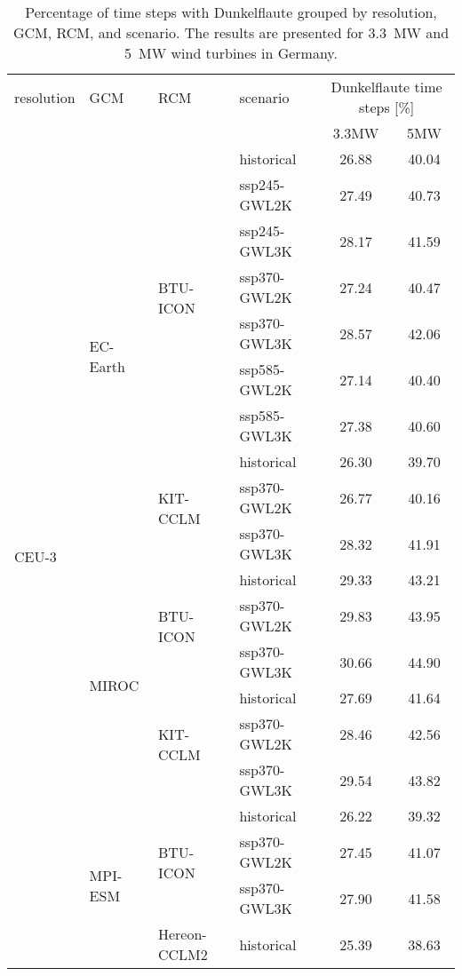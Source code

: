 \begin{table}[!htbp]
\centering
\footnotesize
\caption{Percentage of time steps with Dunkelflaute grouped by resolution, GCM, RCM, and scenario. The results are presented for \qty{3.3}{\mega\watt} and \qty{5}{\mega\watt} wind turbines in Germany.}
\label{Table:Dunkelflaute_changes}
\begin{tabular}{lll|l|cc}
\toprule
resolution & GCM & RCM & scenario & \multicolumn{2}{c}{Dunkelflaute time steps [\%]} \\
 & & & & 3.3\si{\mega\watt} & 5\si{\mega\watt}  \\
\midrule
\multirow{22}{*}{CEU-3} & \multirow{10}{*}{EC-Earth} & \multirow{7}{*}{BTU-ICON} & historical & 26.88 & 40.04 \\
 &  &  & ssp245-GWL2K & 27.49 & 40.73 \\
 &  &  & ssp245-GWL3K & 28.17 & 41.59 \\
 &  &  & ssp370-GWL2K & 27.24 & 40.47 \\
 &  &  & ssp370-GWL3K & 28.57 & 42.06 \\
 &  &  & ssp585-GWL2K & 27.14 & 40.40 \\
 &  &  & ssp585-GWL3K & 27.38 & 40.60 \\
\cmidrule(lr){3-6}
 &  & \multirow{3}{*}{KIT-CCLM} & historical & 26.30 & 39.70 \\
 &  &  & ssp370-GWL2K & 26.77 & 40.16 \\
 &  &  & ssp370-GWL3K & 28.32 & 41.91 \\
\cmidrule(lr){3-6}
\cmidrule(lr){2-6}
 & \multirow{6}{*}{MIROC} & \multirow{3}{*}{BTU-ICON} & historical & 29.33 & 43.21 \\
 &  &  & ssp370-GWL2K & 29.83 & 43.95 \\
 &  &  & ssp370-GWL3K & 30.66 & 44.90 \\
\cmidrule(lr){3-6}
 &  & \multirow{3}{*}{KIT-CCLM} & historical & 27.69 & 41.64 \\
 &  &  & ssp370-GWL2K & 28.46 & 42.56 \\
 &  &  & ssp370-GWL3K & 29.54 & 43.82 \\
\cmidrule(lr){3-6}
\cmidrule(lr){2-6}
 & \multirow{6}{*}{MPI-ESM} & \multirow{3}{*}{BTU-ICON} & historical & 26.22 & 39.32 \\
 &  &  & ssp370-GWL2K & 27.45 & 41.07 \\
 &  &  & ssp370-GWL3K & 27.90 & 41.58 \\
\cmidrule(lr){3-6}
 &  & \multirow{3}{*}{Hereon-CCLM2} & historical & 25.39 & 38.63 \\

\end{tabular}
\end{table}
